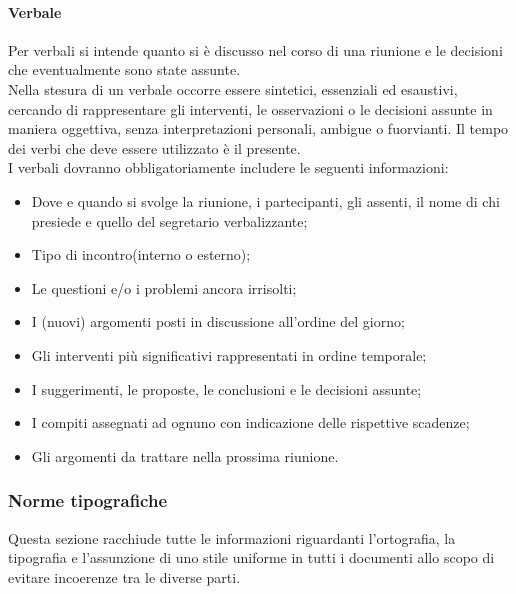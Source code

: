 \paragraph{Verbale}
	Per \gls{verbali} si intende quanto si è discusso nel corso di una riunione e le decisioni che eventualmente sono state assunte. \\
	Nella stesura di un \gls{verbale} occorre essere sintetici, essenziali ed esaustivi, cercando di rappresentare gli interventi, le osservazioni o le decisioni assunte in maniera oggettiva, senza interpretazioni personali, ambigue o fuorvianti. Il tempo dei verbi che deve essere utilizzato è il presente.\\
	I verbali dovranno obbligatoriamente includere le seguenti informazioni:
	\begin{itemize}
		\item Dove e quando si svolge la riunione, i partecipanti, gli assenti, il nome di chi presiede e quello del segretario verbalizzante;
		\item Tipo di incontro(interno o esterno);
		\item Le questioni e/o i problemi ancora irrisolti;
		\item I (nuovi) argomenti posti in discussione all'ordine del giorno;
		\item Gli interventi più significativi rappresentati in ordine temporale; 
		\item I suggerimenti, le proposte, le conclusioni e le decisioni assunte; 
		\item I compiti assegnati ad ognuno con indicazione delle rispettive scadenze; 
		\item Gli argomenti da trattare nella prossima riunione. 
	\end{itemize}


\subsubsection{Norme tipografiche}
Questa sezione racchiude tutte le informazioni riguardanti l'ortografia, la tipografia e l'assunzione di uno stile uniforme in tutti i documenti allo scopo di evitare incoerenze tra le diverse parti.

